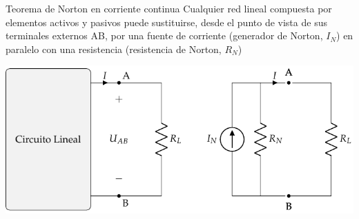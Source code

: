 \documentclass[aspectratio=169, xcolor={usenames,svgnames,dvipsnames}]{beamer}
\begin{document}
\begin{frame}{Teorema de Norton en corriente continua}
    \vspace{3mm}
    Cualquier \alert{red lineal} compuesta por elementos activos y pasivos \alert{puede sustituirse}, desde el punto de vista de sus terminales externos AB, por una \alert{fuente de corriente} (generador de Norton, \(I_N\)) en \alert{paralelo} con una \alert{resistencia} (resistencia de Norton, \(R_N\))

    \vspace{2mm}   
    \begin{center}
        \includegraphics[height=0.6\textheight]{../figs/EquivalenteNorton_R.pdf}
    \end{center}
\end{frame}

\end{document}
